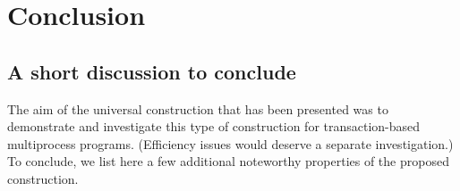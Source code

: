 

\section{Conclusion}
\label{sec:conclusion}



\subsection{A short discussion  to conclude}
\label{sec:discussion} 


The aim of the universal construction that has been presented 
was to demonstrate and investigate this type of construction for
transaction-based multiprocess programs. (Efficiency issues 
would deserve  a separate investigation.) To  conclude, we list  here a few
additional noteworthy properties of the proposed  construction. 

